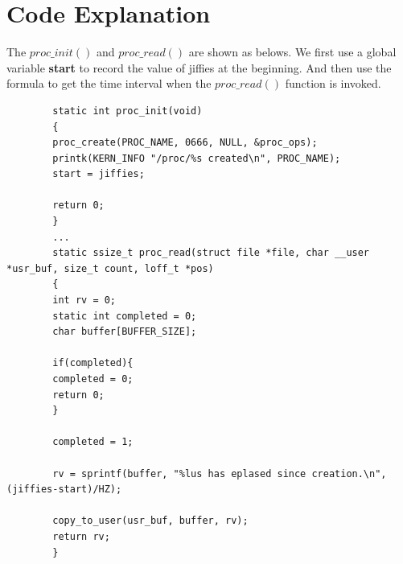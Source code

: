 \documentclass[12pt]{extarticle}
\newcommand{\<}{\langle}
\renewcommand{\>}{\rangle}
\theoremstyle{definition}
\begin{document}
	\section{Code Explanation}
	The $proc\_init()$ and $proc\_read()$ are shown as belows. We first use a global variable \textbf{start} to record the value of jiffies at the beginning. And then use the formula to get the time interval when the $proc\_read()$ function is invoked.
	\begin{lstlisting}
		static int proc_init(void)
		{
		proc_create(PROC_NAME, 0666, NULL, &proc_ops);
		printk(KERN_INFO "/proc/%s created\n", PROC_NAME);
		start = jiffies;
		
		return 0;
		}
		...
		static ssize_t proc_read(struct file *file, char __user *usr_buf, size_t count, loff_t *pos)
		{
		int rv = 0;
		static int completed = 0;
		char buffer[BUFFER_SIZE];
		
		if(completed){
		completed = 0;
		return 0;
		}
		
		completed = 1;
		
		rv = sprintf(buffer, "%lus has eplased since creation.\n", (jiffies-start)/HZ);
		
		copy_to_user(usr_buf, buffer, rv);
		return rv;
		}
	\end{lstlisting}
		
	
\end{document}

